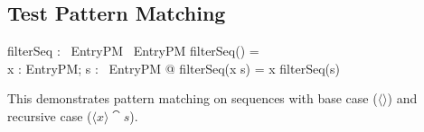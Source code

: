 \documentclass[a4paper,10pt,fleqn]{article}
\begin{document}
\subsection*{Test Pattern Matching}

\begin{zed}
[EntryPM]
\end{zed}

\begin{axdef}
filterSeq : \seq~EntryPM \fun \seq~EntryPM
\where
filterSeq(\langle \rangle) = \langle \rangle \\
\forall x : EntryPM; s : \seq~EntryPM @ filterSeq(\langle x \rangle \cat s) = \langle x \rangle \cat filterSeq(s)
\end{axdef}

\noindent This demonstrates pattern matching on sequences with base case ($\langle \rangle$) and recursive case ($\langle x \rangle \cat s$).

\bigskip
\end{document}
